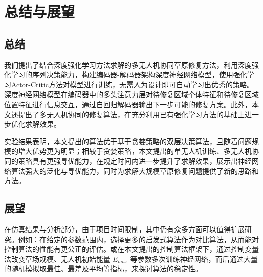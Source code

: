 \documentclass[AutoFakeBold]{LZUThesis}
\begin{document}
\chapter{总结与展望}

\section{总结}
我们提出了结合深度强化学习方法求解的多无人机协同草原修复方法，利用深度强化学习的序列决策能力，构建编码器-解码器架构深度神经网络模型，使用强化学习Actor-Critic方法对模型进行训练，无需人为设计即可自动学习出优秀的策略。深度神经网络模型在编码器中的多头注意力层对待修复区域个体特征和待修复区域位置特征进行信息交互，通过自回归解码器输出下一步可能的修复方案。此外，本文还提出了多无人机协同的修复算法，在充分利用已有强化学习方法的基础上进一步优化求解效果。

实验结果表明，本文提出的算法优于基于贪婪策略的双层决策算法，且随着问题规模的增大优势更为明显；相较于贪婪策略，本文提出的单无人机训练、多无人机协同的策略具有更强寻优能力，在规定时间内进一步提升了求解效果，展示出神经网络算法强大的泛化与寻优能力，同时为求解大规模草原修复问题提供了新的思路和方法。

\section{展望}
在仿真结果与分析部分，由于项目时间限制，其中仍有众多方面可以值得扩展研究。例如：在给定的参数范围内，选择更多的启发式算法作为对比算法，从而能对控制算法的性能有更公正的评估。或在本文提出的控制算法框架下，通过控制变量法改变草场规模、无人机初始能量 $E_{max}$ 等参数多次训练神经网络，而后通过大量的随机模拟取最佳、最差及平均等指标，来探讨算法的稳定性。


\end{document}
